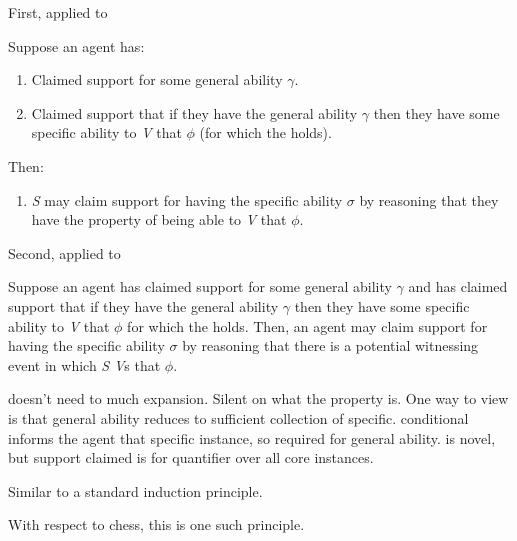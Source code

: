 \begin{note}[\gsi{}++]
  First, \gsi{} applied to \AR{}
  \begin{proposition}[\textsf{|gs-I\space·\space H|}]
    Suppose an agent has:
    \begin{enumerate}
    \item Claimed support for some general ability \(\gamma\).
    \item Claimed support that if they have the general ability \(\gamma\) then they have some specific ability to \emph{V} that \(\phi\) (for which the \aben{} holds).
    \end{enumerate}
    Then:
    \begin{enumerate}[resume]
    \item \emph{S} may claim support for having the specific ability \(\sigma\) by reasoning that they have the property of being able to \emph{V} that \(\phi\).
    \end{enumerate}
    \vspace{-\topsep}\vspace{-\topsep}
  \end{proposition}
  Second, \gsi{} applied to \WR{}
  \begin{proposition}\label{W:s}
        Suppose an agent has claimed support for some general ability \(\gamma\) and has claimed support that if they have the general ability \(\gamma\) then they have some specific ability to \emph{V} that \(\phi\) for which the \aben{} holds.
    Then, an agent may claim support for having the specific ability \(\sigma\) by reasoning that there is a potential witnessing event in which \emph{S} \emph{V}s that \(\phi\).
  \end{proposition}
\end{note}

\begin{note}
  \AR{} doesn't need to much expansion.
  Silent on what the property is.
  One way to view is that general ability reduces to sufficient collection of specific.
  \gsi{} conditional informs the agent that specific instance, so required for general ability.
  \gsi{} is novel, but support claimed is for quantifier over all core instances.

  Similar to a standard induction principle.

  With respect to chess, this is one such principle.
\end{note}

